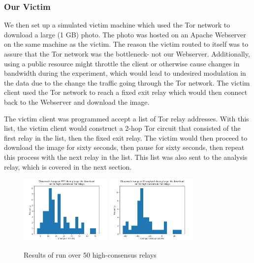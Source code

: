 \documentclass[12pt,journal]{IEEEtran}
\begin{document}
\subsubsection{Our Victim}We then set up a simulated victim machine which used the Tor network to download a large (1 GB) photo. The photo was hosted on an Apache Webserver on the same machine as the victim. The reason the victim routed to itself was to assure that the Tor network was the bottleneck- not our Webserver. Additionally, using a public resource might throttle the client or otherwise cause changes in bandwidth during the experiment, which would lead to undesired modulation in the data due to the change the traffic going through the Tor network. The victim client used the Tor network to reach a fixed exit relay which would then connect back to the Webserver and download the image.
\par
The victim client was programmed accept a list of Tor relay addresses. With this list, the victim client would construct a 2-hop Tor circuit that consisted of the first relay in the list, then the fixed exit relay. The victim would then proceed to download the image for sixty seconds, then pause for sixty seconds, then repeat this process with the next relay in the list. This list was also sent to the analysis relay, which is covered in the next section.

\begin{figure}
 \center
  \includegraphics[width=0.4\textwidth]{figures/rtt_guard.png}
  \includegraphics[width=0.4\textwidth]{figures/thr_guard.png}
  \caption{Results of run over 50 high-consensus relays}
  \label{AAA}
\end{figure}
\end{document}
